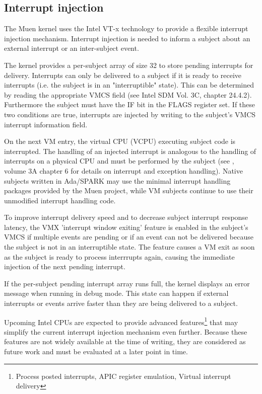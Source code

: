 \subsection{Interrupt injection}\label{subsec:int-injection}
The Muen kernel uses the Intel VT-x technology to provide a flexible interrupt
injection mechanism. Interrupt injection is needed to inform a subject about an
external interrupt or an inter-subject event.

The kernel provides a per-subject array of size 32 to store pending interrupts
for delivery.  Interrupts can only be delivered to a subject if it is ready to
receive interrupts (i.e. the subject is in an "interruptible" state). This can
be determined by reading the appropriate VMCS field (see Intel SDM
\cite{IntelSDM} Vol. 3C, chapter 24.4.2). Furthermore the subject must have the
IF bit in the FLAGS register set. If these two conditions are true, interrupts
are injected by writing to the subject's VMCS interrupt information field.

On the next VM entry, the virtual CPU (VCPU) executing subject code
is interrupted. The handling of an injected interrupt is analogous to the
handling of interrupts on a physical CPU and must be performed by the subject
(see \cite{IntelSDM}, volume 3A chapter 6 for details on interrupt and exception
 handling). Native subjects written in Ada/SPARK may use the minimal interrupt
handling packages provided by the Muen project, while VM subjects continue to
use their unmodified interrupt handling code.

To improve interrupt delivery speed and to decrease subject interrupt response
latency, the VMX 'interrupt window exiting' feature is enabled in the subject's
VMCS if multiple events are pending or if an event can not be delivered because
the subject is not in an interruptible state. The feature causes a VM exit as
soon as the subject is ready to process interrrupts again, causing the immediate
injection of the next pending interrupt.

If the per-subject pending interrupt array runs full, the kernel displays an
error message when running in debug mode. This state can happen if external
interrupts or events arrive faster than they are being delivered to a subject.

Upcoming Intel CPUs are expected to provide advanced
features\footnote{Process posted interrupts, APIC register emulation, Virtual
interrupt delivery} that may simplify the current interrupt injection mechanism
even further. Because these features are not widely available at the time of
writing, they are considered as future work and must be evaluated at a later
point in time.
